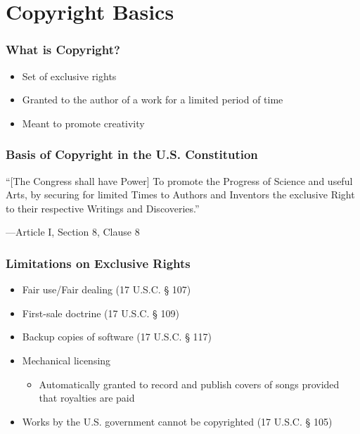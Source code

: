 \section{Copyright Basics}

\begin{frame}
  \frametitle{What is Copyright?}

  \begin{itemize}
    \item Set of exclusive rights
    \item Granted to the author of a work for a limited period of time
    \item Meant to promote creativity
  \end{itemize}
\end{frame}

\begin{frame}
  \frametitle{Basis of Copyright in the U.S. Constitution}

  ``[The Congress shall have Power] To promote the Progress of Science and useful
  Arts, by securing for limited Times to Authors and Inventors the exclusive
  Right to their respective Writings and Discoveries.''

  \begin{flushright}
    ---Article I, Section 8, Clause 8
  \end{flushright}
\end{frame}

\begin{frame}
  \frametitle{Limitations on Exclusive Rights}

  \begin{itemize}
    \item Fair use/Fair dealing (17 U.S.C. § 107)
    \item First-sale doctrine (17 U.S.C. § 109)
    \item Backup copies of software (17 U.S.C. § 117)
    \item Mechanical licensing
    \begin{itemize}
      \item Automatically granted to record and publish covers of songs provided
      that royalties are paid
    \end{itemize}
    \item Works by the U.S. government cannot be copyrighted (17 U.S.C. § 105)
  \end{itemize}
\end{frame}
